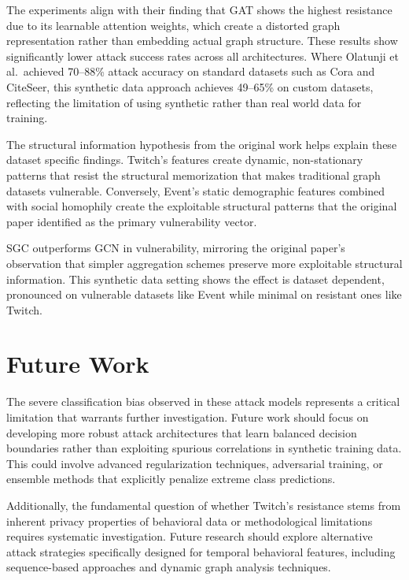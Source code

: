 \documentclass{article}
\begin{document}
The experiments align with their finding that GAT shows the highest resistance due to its learnable attention weights, which create a distorted graph representation rather than embedding actual graph structure. These results show significantly lower attack success rates across all architectures. Where Olatunji et al.\ achieved 70--88\% attack accuracy on standard datasets such as Cora and CiteSeer, this synthetic data approach achieves 49--65\% on custom datasets, reflecting the limitation of using synthetic rather than real world data for training.

The structural information hypothesis from the original work helps explain these dataset specific findings. Twitch's features create dynamic, non-stationary patterns that resist the structural memorization that makes traditional graph datasets vulnerable. Conversely, Event's static demographic features combined with social homophily create the exploitable structural patterns that the original paper identified as the primary vulnerability vector.

SGC outperforms GCN in vulnerability, mirroring the original paper's observation that simpler aggregation schemes preserve more exploitable structural information. This synthetic data setting shows the effect is dataset dependent, pronounced on vulnerable datasets like Event while minimal on resistant ones like Twitch.

\section{Future Work}

The severe classification bias observed in these attack models represents a critical limitation that warrants further investigation. Future work should focus on developing more robust attack architectures that learn balanced decision boundaries rather than exploiting spurious correlations in synthetic training data. This could involve advanced regularization techniques, adversarial training, or ensemble methods that explicitly penalize extreme class predictions.

Additionally, the fundamental question of whether Twitch's resistance stems from inherent privacy properties of behavioral data or methodological limitations requires systematic investigation. Future research should explore alternative attack strategies specifically designed for temporal behavioral features, including sequence-based approaches and dynamic graph analysis techniques.
\end{document}

